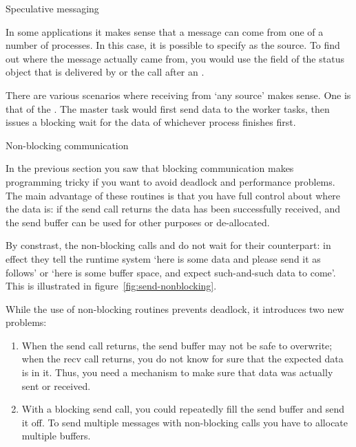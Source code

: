  {Speculative messaging}

In some applications it makes sense that a message can come from 
one of a number of processes. In this case, it is possible to specify
 as the source. To find out where the message actually
came from, you would use the  field of the status object
that is delivered by  or the  call after an .

There are various scenarios where receiving from `any source' makes sense.
One is that of the . The master task would first send
data to the worker tasks, then issues a blocking wait for the data of whichever process
finishes first.



 {Non-blocking communication}

In the previous section you saw that blocking communication makes
programming tricky if you want to avoid deadlock and performance
problems. The main advantage of these routines is that you have full
control about where the data is: if the send call returns
the data has been successfully received, and the send buffer can be used for
other purposes or de-allocated.  

By constrast, the non-blocking calls  and 
do not wait for their counterpart: in effect they tell the runtime
system `here is some data and please send it as follows' or `here is
some buffer space, and expect such-and-such data to
come'. 
This is illustrated in figure~\ref{fig:send-nonblocking}.

While the use of non-blocking routines prevents deadlock, it
introduces two new problems:
\begin{enumerate}
\item When the send call returns, the send buffer may not be safe to
  overwrite; when the recv call returns, you do not know for sure that
  the expected data is in it. Thus, you need a mechanism to make sure
  that data was actually sent or received.
\item With a blocking send call, you could repeatedly fill the send
  buffer and send it off. To send multiple messages with non-blocking calls
  you have to allocate multiple buffers.
\end{enumerate}

